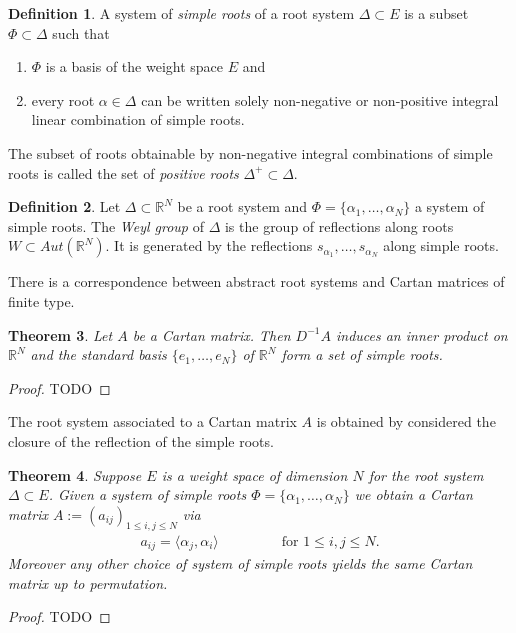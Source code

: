 \documentclass{amsart}
\newtheorem{theorem}{Theorem}[section]
\theoremstyle{definition}
\newtheorem{definition}[theorem]{Definition}
\begin{document}
\begin{definition}
	A system of \emph{simple roots} of a root system $\Delta\subset E$ is a subset $\Phi \subset \Delta$ such that
	\begin{enumerate}
		\item $\Phi$ is a basis of  the weight space $E$ and
		\item every root  $\alpha \in \Delta$ can be written solely non-negative or non-positive integral linear combination of simple roots.
	\end{enumerate}
	The subset of roots obtainable by non-negative integral combinations of simple roots is called the set of \emph{positive roots} $\Delta^+ \subset \Delta$.
\end{definition}

\begin{definition}
	Let $\Delta \subset \mathbb R^N$ be a root system and $\Phi= \{ \alpha_1, \dotsc , \alpha_N\}$ a system of simple roots.
	The \emph{Weyl group} of $\Delta$ is the group of reflections along roots $W \subset Aut (\mathbb R^N)$.
	It is generated by the reflections $s_{\alpha_1}, \dotsc , s_{\alpha_N}$ along simple roots. 
\end{definition}

There is a correspondence between abstract root systems and Cartan matrices of finite type.

\begin{theorem}
	Let $A$ be a Cartan matrix.
	Then $D^{-1}A$ induces an inner product on $\mathbb R^N$ and the 
	standard basis $\{ e_1, \dotsc, e_N\}$ of $\mathbb R^N$ form a set of simple roots.
\end{theorem}
\begin{proof}
	TODO
\end{proof}
The root system associated to a Cartan matrix $A$ is obtained by considered the closure of the reflection of the simple roots.

\begin{theorem}
	Suppose $E$ is a weight space of dimension $N$ for the root system  $\Delta \subset E$. Given a system of simple roots $\Phi = \{ \alpha_1, \dotsc, \alpha_N\}$ we obtain a Cartan matrix $A:= (a_{ij})_{1\leq i,j \leq N}$ via
	\begin{align}
		a_{ij} = \langle \alpha_j , \alpha_i \rangle \,\qquad \qquad \text{ for } 1 \leq i,j\leq N.
	\end{align}
	Moreover any other choice of system of simple roots yields the same Cartan matrix up to permutation.
\end{theorem}
\begin{proof}
	TODO
\end{proof}
\end{document}
